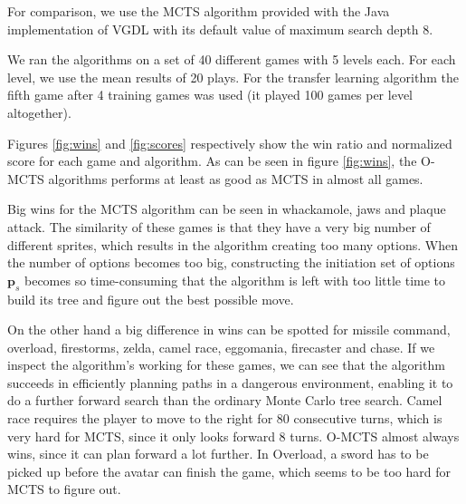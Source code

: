 For comparison, we use the MCTS algorithm provided with the Java implementation
of VGDL with its default value of maximum search depth 8. 

We ran the algorithms on a set of 40 different games with 5 levels each. For
each level, we use the mean results of 20 plays. For the transfer learning
algorithm the fifth game after 4 training games was used (it played 100
games per level altogether).

Figures \ref{fig:wins} and \ref{fig:scores} respectively show the win ratio and
normalized score for each game and algorithm. As can be seen in figure
\ref{fig:wins}, the O-MCTS algorithms performs at least as good as MCTS in
almost all games. 

Big wins for the MCTS algorithm can be seen in whackamole, jaws and plaque
attack. The similarity of these games is that they have a very big number of
different sprites, which results in the algorithm creating too many options.
When the number of options becomes too big, constructing the initiation set of
options $\mathbf{p}_s$ becomes so time-consuming that the algorithm is left with
too little time to build its tree and figure out the best possible move.

On the other hand a big difference in wins can be spotted for missile command,
overload, firestorms, zelda, camel race, eggomania, firecaster and chase. If we
inspect the algorithm's working for these games, we can see that the algorithm
succeeds in efficiently planning paths in a dangerous environment, enabling it
to do a further forward search than the ordinary Monte Carlo tree search. Camel
race requires the player to move to the right for 80 consecutive turns, which is
very hard for MCTS, since it only looks forward 8 turns. O-MCTS almost always
wins, since it can plan forward a lot further. In Overload, a sword has to be
picked up before the avatar can finish the game, which seems to be too hard for
MCTS to figure out.

